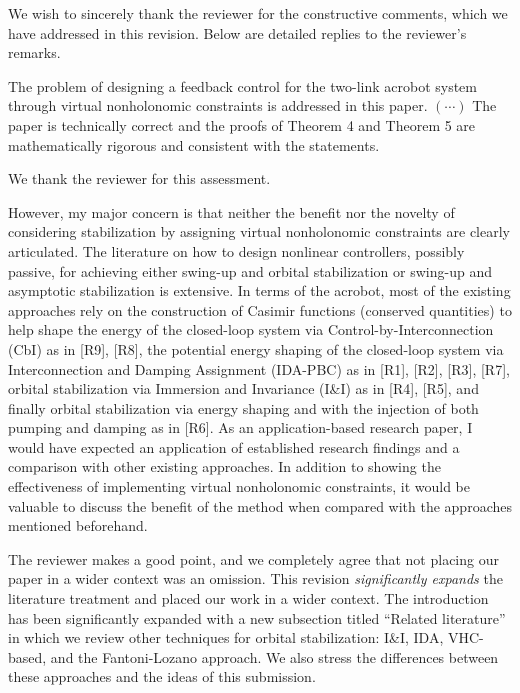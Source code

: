 \documentclass[11pt,letter]{article}
\newenvironment{myquote}{%
\bigskip%
\begin{tcolorbox}[]\footnotesize}{%
\end{tcolorbox}%
\bigskip}
\begin{document}
We wish to sincerely thank the reviewer for the constructive comments,
which we have  addressed in this revision. Below are
detailed replies to the reviewer's remarks.



\begin{myquote}
The problem of designing a feedback control for the two-link acrobot
system through virtual nonholonomic constraints is addressed in this
paper. \((\cdots)\) 
The paper is technically correct and the proofs of Theorem 4 and
Theorem 5 are mathematically rigorous and consistent with the
statements.
\end{myquote}

We thank the reviewer for this assessment.

\begin{myquote}
However, my major concern is that neither the benefit nor
the novelty of considering stabilization by assigning virtual
nonholonomic constraints are clearly articulated. The literature on how
to design nonlinear controllers, possibly passive, for achieving either
swing-up and orbital stabilization or swing-up and asymptotic
stabilization is extensive. In terms of the acrobot, most of the
existing approaches rely on the construction of Casimir functions
(conserved quantities) to help shape the energy of the closed-loop
system via Control-by-Interconnection (CbI) as in [R9], [R8], the
potential energy shaping of the closed-loop system via Interconnection
and Damping Assignment (IDA-PBC) as in [R1], [R2], [R3], [R7], orbital
stabilization via Immersion and Invariance (I\&I) as in [R4], [R5], and
finally orbital stabilization via energy shaping and with the injection
of both pumping and damping as in [R6]. As an application-based
research paper, I would have expected an application of established
research findings and a comparison with other existing approaches. In
addition to showing the effectiveness of implementing virtual
nonholonomic constraints, it would be valuable to discuss the benefit
of the method when compared with the approaches mentioned beforehand. 
\end{myquote}


The reviewer makes a good point, and we completely agree that not placing our paper in a wider context was an omission. This revision \emph{significantly expands} the literature treatment and placed our work in a wider context. The introduction has been significantly expanded with a new subsection titled ``Related literature'' in which we review other techniques for orbital stabilization: I\&I, IDA, VHC-based, and the Fantoni-Lozano approach. We also stress the differences between these approaches and the ideas of this submission.
\end{document}
